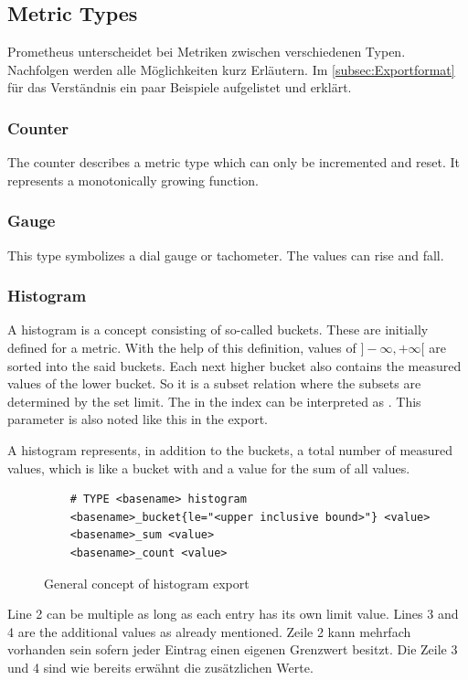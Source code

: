 \subsection{Metric Types}
Prometheus unterscheidet bei Metriken zwischen verschiedenen Typen. Nachfolgen werden alle Möglichkeiten kurz Erläutern. Im \autoref{subsec:Exportformat}  für das Verständnis ein paar Beispiele aufgelistet und erklärt.
\subsubsection{Counter}
The counter describes a metric type which can only be incremented and reset. It represents a monotonically growing function. 
\subsubsection{Gauge}
This type symbolizes a dial gauge or tachometer. The values can rise and fall.
\subsubsection{Histogram}
A histogram is a concept consisting of so-called buckets. These are initially defined for a metric. With the help of this definition, values of $]-\infty,+\infty[$ are sorted into the said buckets. Each next higher bucket also contains the measured values of the lower bucket. So it is a subset relation where the subsets are determined by the set limit. The  in the index can be interpreted as . This parameter is also noted like this in the export.
\begin{center}
\end{center}
A histogram represents, in addition to the buckets, a total number of measured values, which is like a bucket with  and a value for the sum of all values.
\begin{figure}[hbt!]
	\begin{verbatim}
	# TYPE <basename> histogram
	<basename>_bucket{le="<upper inclusive bound>"} <value>
	<basename>_sum <value>
	<basename>_count <value>
	\end{verbatim}
	\caption{General concept of histogram export}
\end{figure}
Line 2 can be multiple as long as each entry has its own limit value. Lines 3 and 4 are the additional values as already mentioned.
Zeile 2 kann mehrfach vorhanden sein sofern jeder Eintrag einen eigenen Grenzwert besitzt. Die Zeile 3 und 4 sind wie bereits erwähnt die zusätzlichen Werte.
